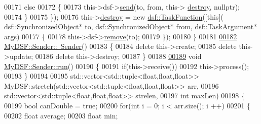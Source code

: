 \begin{DoxyCode}
00171                                              \textcolor{keywordflow}{else}
00172                                              \{
00173                                                  this->dsf->\hyperlink{classdsf_1_1_dual_state_framework_a3063d7f0ce537eb44dc2bdcec816a36b}{send}(to, from, this->
      \hyperlink{class_my_d_s_f_1_1_sender_a15d42b9428ac6e290d84937824058bc2}{destroy}, \textcolor{keyword}{nullptr});
00174                                              \}
00175                                          \});
00176     this->\hyperlink{class_my_d_s_f_1_1_sender_a15d42b9428ac6e290d84937824058bc2}{destroy} = \textcolor{keyword}{new} \hyperlink{namespacedsf_aa16e735f29587f4485b56fc46746f7a9}{dsf::TaskFunction}([\textcolor{keyword}{this}](
      \hyperlink{classdsf_1_1_synchronized_object}{dsf::SynchronizedObject}* to, \hyperlink{classdsf_1_1_synchronized_object}{dsf::SynchronizedObject}* from, 
      \hyperlink{classyc_1_1_any}{dsf::TaskArgument}* args)
00177                                           \{
00178                                               this->dsf->\hyperlink{classdsf_1_1_dual_state_framework_ab6ca84c5186f4fc3e048c4ff7a104ae7}{remove}(to);
00179                                           \});
00180 \}
00181 
\hypertarget{_my_d_s_f_8cpp_source_l00182}{}\hyperlink{class_my_d_s_f_1_1_sender_a2f57637935caf346a15d56a86907caa5}{00182} \hyperlink{class_my_d_s_f_1_1_sender_a2f57637935caf346a15d56a86907caa5}{MyDSF::Sender::~Sender}()
00183 \{
00184     \textcolor{keyword}{delete} this->create;
00185     \textcolor{keyword}{delete} this->update;
00186     \textcolor{keyword}{delete} this->destroy;
00187 \}
00188 
\hypertarget{_my_d_s_f_8cpp_source_l00189}{}\hyperlink{class_my_d_s_f_1_1_sender_a0d328bcb8646e429712d2dd62ab9d201}{00189} \textcolor{keywordtype}{void} \hyperlink{class_my_d_s_f_1_1_sender_a0d328bcb8646e429712d2dd62ab9d201}{MyDSF::Sender::run}()
00190 \{
00191     \textcolor{keywordflow}{if}(this->receive())
00192         this->process();
00193 \}
00194 
00195 std::vector<std::tuple<float,float,float>> MyDSF::stretch(std::vector<std::tuple<float,float,float>> arr,
00196                                                    std::vector<std::tuple<float,float,float>> strelen,
00197                                                    \textcolor{keywordtype}{int} maxLen)
00198 \{
00199     \textcolor{keywordtype}{bool} canDouble = \textcolor{keyword}{true};
00200     \textcolor{keywordflow}{for}(\textcolor{keywordtype}{int} i = 0; i < arr.size(); i ++)
00201     \{
00202         \textcolor{keywordtype}{float} average;
00203         \textcolor{keywordtype}{float} min;

\end{DoxyCode}
